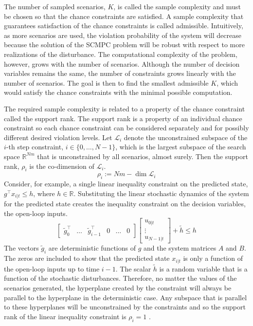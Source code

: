 \documentclass[12 pt]{report}
\begin{document}
The number of sampled scenarios, $K$, is called the sample complexity and must be chosen so that the chance constraints are satisfied. A sample complexity that guarantees satisfaction of the chance constraints is called admissible. Intuitively, as more scenarios are used, the violation probability of the system will decrease because the solution of the SCMPC problem will be robust with respect to more realizations of the disturbance. The computational complexity of the problem, however, grows with the number of scenarios. Although the number of decision variables remains the same, the number of constraints grows linearly with the number of scenarios. The goal is then to find the smallest admissible $K$, which would satisfy the chance constraints with the minimal possible computation.

The required sample complexity is related to a property of the chance constraint called the support rank. The support rank is a property of an individual chance constraint so each chance constraint can be considered separately and for possibly different desired violation levels. Let $\mathcal{L}_i$ denote the unconstrained subspace of the $i$-th step constraint, $i \in \{0,\dots,N-1\}$, which is the largest subspace of the search space $\mathbb{R}^{Nm}$ that is unconstrained by all scenarios, almost surely. Then the support rank, $\rho_i$ is the co-dimension of $\mathcal{L}_i$. $$ \rho_i := Nm - \dim \mathcal{L}_i$$
Consider, for example, a single linear inequality constraint on the predicted state, $ g^\top x_{i|t} \leq h$, where $h \in \mathbb{R}$. Substituting the linear stochastic dynamics of the system for the predicted state creates the inequality constraint on the decision variables, the open-loop inputs.
\begin{displaymath}
\begin{bmatrix}
\tilde{g}_{0}^\top & \dots & \tilde{g}_{i-1}^\top & 0 & \dots & 0 
\end{bmatrix}
\begin{bmatrix}
u_{0|t} \\ \vdots \\ u_{N-1|t}
\end{bmatrix} + \tilde{h} \leq h
\end{displaymath}
The vectors $\tilde{g}_i$ are deterministic functions of $g$ and the system matrices $A$ and $B$. The zeros are included to show that the predicted state $x_{i|t}$ is only a function of the open-loop inputs up to time $i-1$. The scalar $\tilde{h}$ is a random variable that is a function of the stochastic disturbances. Therefore, no matter the values of the scenarios generated, the hyperplane created by the constraint will always be parallel to the hyperplane in the deterministic case. Any subspace that is parallel to these hyperplanes will be unconstrained by the constraints and so the support rank of the linear inequality constraint is $\rho_i = 1$ \cite{schildbach13}.
\end{document}
